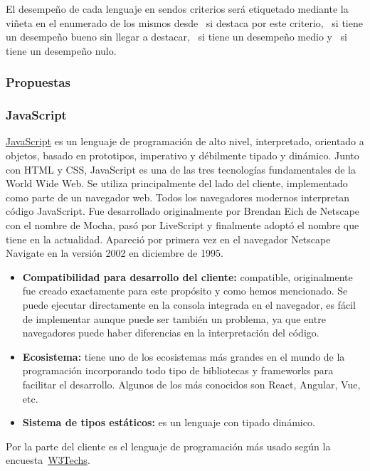 El desempeño de cada lenguaje en sendos criterios será etiquetado mediante la viñeta en el enumerado de los mismos desde \esp~si destaca por este criterio, \bien~si tiene un desempeño bueno sin llegar a destacar, \regular~si tiene un desempeño medio y \mal~si tiene un desempeño nulo.

\subsubsection{Propuestas}

\subsubsection{JavaScript}

\href{https://es.wikipedia.org/w/index.php?title=JavaScript&oldid=161023746}{JavaScript} es un lenguaje de programación de alto nivel, interpretado, orientado a objetos, basado en prototipos, imperativo y débilmente tipado y dinámico. Junto con HTML y CSS, JavaScript es una de las tres tecnologías fundamentales de la World Wide Web. Se utiliza principalmente del lado del cliente, implementado como parte de un navegador web. Todos los navegadores modernos interpretan código JavaScript. Fue desarrollado originalmente por Brendan Eich de Netscape con el nombre de Mocha, pasó por LiveScript y finalmente adoptó el nombre que tiene en la actualidad. Apareció por primera vez en el navegador Netscape Navigate en la versión 2002 en diciembre de 1995.

\begin{itemize}
    \item[\esp] \textbf{Compatibilidad para desarrollo del cliente:} compatible, originalmente fue creado exactamente para este propósito y como hemos mencionado. Se puede ejecutar directamente en la consola integrada en el navegador, es fácil de implementar aunque puede ser también un problema, ya que entre navegadores puede haber diferencias en la interpretación del código.
    \item[\esp] \textbf{Ecosistema:} tiene uno de los ecosistemas más grandes en el mundo de la programación incorporando todo tipo de bibliotecas y frameworks para facilitar el desarrollo. Algunos de los más conocidos son React, Angular, Vue, etc.
    \item[\mal] \textbf{Sistema de tipos estáticos:} es un lenguaje con tipado dinámico.
\end{itemize}

Por la parte del cliente es el lenguaje de programación más usado según la encuesta~\href{https://w3techs.com/technologies/overview/client_side_language}{W3Techs}.


